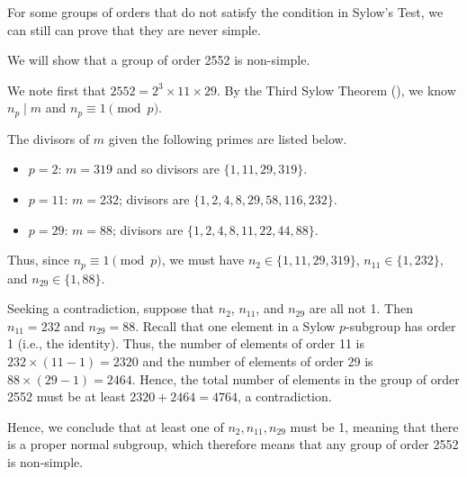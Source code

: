 For some groups of orders that do not satisfy the condition in Sylow's Test, we can still can prove that they are never simple.

\begin{example}
    We will show that a group of order 2552 is non-simple.

    We note first that $2552 = 2^3 \times 11 \times 29$. By the Third Sylow Theorem (), we know $n_p \mid m$ and $n_p \equiv 1 \pmod p$.

    The divisors of $m$ given the following primes are listed below.
    \begin{itemize}
        \item $p = 2$: $m = 319$ and so divisors are $\{1, 11, 29, 319\}$.
        \item $p = 11$: $m = 232$; divisors are $\{1, 2, 4, 8, 29, 58, 116, 232\}$.
        \item $p = 29$: $m = 88$; divisors are $\{1, 2, 4, 8, 11, 22, 44, 88\}$.
    \end{itemize}
    Thus, since $n_p \equiv 1 \pmod p$, we must have $n_2 \in \{1, 11, 29, 319\}$, $n_{11} \in \{1, 232\}$, and $n_{29} \in \{1, 88\}$.

    Seeking a contradiction, suppose that $n_2$, $n_{11}$, and $n_{29}$ are all not 1. Then $n_{11} = 232$ and $n_{29} = 88$. Recall that one element in a Sylow $p$-subgroup has order 1 (i.e., the identity). Thus, the number of elements of order 11 is $232 \times (11 - 1) = 2320$ and the number of elements of order 29 is $88 \times (29 - 1) = 2464$. Hence, the total number of elements in the group of order 2552 must be at least $2320 + 2464 = 4764$, a contradiction.

    Hence, we conclude that at least one of $n_2, n_{11}, n_{29}$ must be 1, meaning that there is a proper normal subgroup, which therefore means that any group of order 2552 is non-simple.
\end{example}

